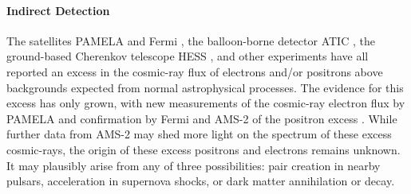 
\paragraph{Indirect Detection}The satellites PAMELA \cite{Adriani:2008zr} and Fermi \cite{Ackermann:2010ij}, the balloon-borne detector ATIC \cite{Chang:2008aa}, the ground-based Cherenkov telescope HESS \cite{Aharonian:2008aa,Aharonian:2009ah}, and other experiments have all reported an excess in the cosmic-ray flux of electrons and/or positrons above backgrounds expected from normal astrophysical processes.  
The evidence for this excess has only grown, with new measurements of the cosmic-ray electron flux by PAMELA \cite{Adriani:2011xv} and confirmation by Fermi and AMS-2 of the positron excess \cite{FermiLAT:2011ab,AMS2:2013}.  While further data from AMS-2 may shed more light on the spectrum of these excess cosmic-rays, the origin of these excess positrons and electrons remains unknown.  It may plausibly arise from any of three possibilities: pair creation in nearby pulsars, acceleration in supernova shocks, or dark matter annihilation or decay.


